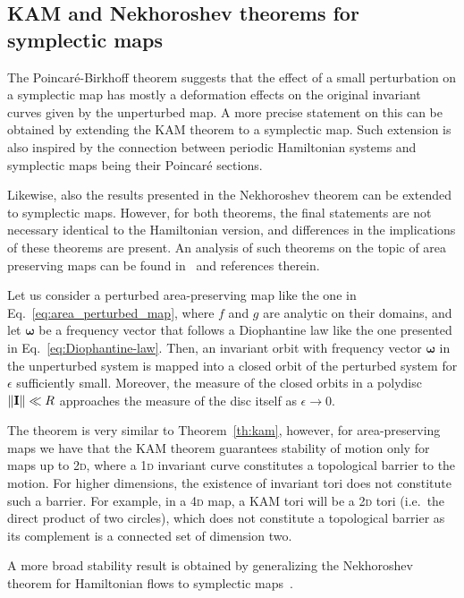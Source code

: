 \subsection{KAM and Nekhoroshev theorems for symplectic maps}

The Poincaré-Birkhoff theorem suggests that the effect of a small perturbation on a symplectic map has mostly a deformation effects on the original invariant curves given by the unperturbed map. A more precise statement on this can be obtained by extending the KAM theorem to a symplectic map. Such extension is also inspired by the connection between periodic Hamiltonian systems and symplectic maps being their Poincaré sections.

Likewise, also the results presented in the Nekhoroshev theorem can be extended to symplectic maps. However, for both theorems, the final statements are not necessary identical to the Hamiltonian version, and differences in the implications of these theorems are present. An analysis of such theorems on the topic of area preserving maps can be found in~\cite{Bazzani:262179} and references therein.

\begin{theorem}
    Let us consider a perturbed area-pre\-ser\-ving map like the one in Eq.~\eqref{eq:area_perturbed_map}, where $f$ and $g$ are analytic on their domains, and let $\boldsymbol{\omega}$ be a frequency vector that follows a Diophantine law like the one presented in Eq.~\eqref{eq:Diophantine-law}. Then, an invariant orbit with frequency vector $\boldsymbol{\omega}$ in the unperturbed system is mapped into a closed orbit of the perturbed system for $\epsilon$ sufficiently small. Moreover, the measure of the closed orbits in a polydisc $\norm{\vb{I}} \ll R$ approaches the measure of the disc itself as $\epsilon \to 0$. 
\end{theorem}

The theorem is very similar to Theorem~\ref{th:kam}, however, for area-preserving maps we have that the KAM theorem guarantees stability of motion only for maps up to 2\textsc{d}, where a 1\textsc{d} invariant curve constitutes a topological barrier to the motion. For higher dimensions, the existence of invariant tori does not constitute such a barrier. For example, in a 4\textsc{d} map, a KAM tori will be a 2\textsc{d} tori (i.e.\ the direct product of two circles), which does not constitute a topological barrier as its complement is a connected set of dimension two.

A more broad stability result is obtained by generalizing the Nekhoroshev theorem for Hamiltonian flows to symplectic maps~\cite{Bazzani:1990aa, Turchetti:1990aa}.

